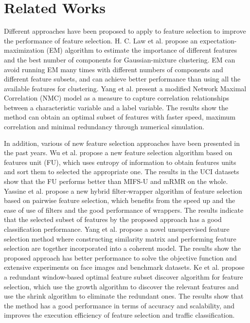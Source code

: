 \documentclass[journal]{IEEEtran}
\begin{document}
\section{Related Works}
\label{sec:related}

Different approaches have been proposed to apply to feature selection to improve the performance of feature selection. H. C. Law et al. propose an expectation-maximization (EM) algorithm to estimate the importance of different features and the best number of components for Gaussian-mixture clustering\cite{Law2004}. EM can avoid running EM many times with different numbers of components and different feature subsets, and can achieve better performance than using all the available features for clustering. Yang et al.\cite{Yang2018} present a modified Network Maximal Correlation (NMC) model as a measure to capture correlation relationships between a characteristic variable and a label variable. The results show the method can obtain an optimal subset of features with faster speed, maximum correlation and minimal redundancy through numerical simulation.

In addition, various of new feature selection approaches have been presented in the past years. Wu et al. \cite{Wu2017}propose a new feature selection algorithm based on features unit (FU), which uses entropy of information to obtain features units and sort them to selected the appropriate one. The results in the UCI datasets show that the FU performs better than MIFS-U and mRMR on the whole. Yassine et al.\cite{Yassine2017} propose a new hybrid filter-wrapper algorithm of feature selection based on pairwise feature selection, which benefits from the speed up and the ease of use of filters and the good performance of wrappers. The results indicate that the selected subset of features by the proposed approach has a good classification performance. Yang et al. \cite{Yang2018a} propose a novel unsupervised feature selection method where constructing similarity matrix and performing feature selection are together incorporated into a coherent model. The results show the proposed approach has better performance to solve the objective function and extensive experiments on face images and benchmark datasets. Ke et al. \cite{Ke2018} propose a redundant window-based optimal feature subset discover algorithm for feature selection, which use the growth algorithm to discover the relevant features and use the shrink algorithm to eliminate the redundant ones. The results show that the method has a good performance in terms of accuracy and scalability, and improves the execution efficiency of feature selection and traffic classification.
\end{document}
